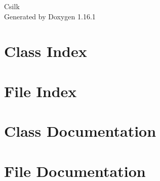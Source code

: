 \documentclass[twoside]{book}
\newcommand{\+}{\discretionary{\mbox{\scriptsize$\hookleftarrow$}}{}{}}
\newcommand{\clearemptydoublepage}{%
    \newpage{\pagestyle{empty}\cleardoublepage}%
  }
\begin{document}
  \raggedbottom
    \hypersetup{pageanchor=false,
                bookmarksnumbered=true,
                pdfencoding=unicode
               }
  \begin{titlepage}
  \vspace*{7cm}
  \begin{center}%
  {\Large Csilk}\\
  \vspace*{1cm}
  {\large Generated by Doxygen 1.16.1}\\
  \end{center}
  \end{titlepage}
  \clearemptydoublepage
  \tableofcontents
  \clearemptydoublepage
  \hypersetup{pageanchor=true}
\chapter{Class Index}

\chapter{File Index}

\chapter{Class Documentation}



















\chapter{File Documentation}














  \backmatter
  \newpage
  \clearemptydoublepage
  \printindex
\end{document}
